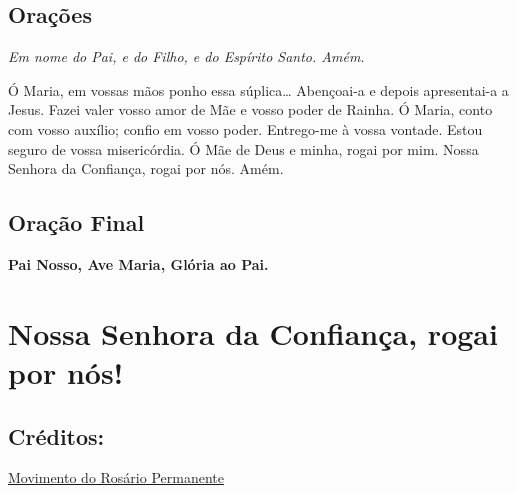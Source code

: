 \documentclass[18pt]{article}
\begin{document}
\begin{justify}

\newpage
\begin{center}
 \section{Orações}\label{sec:Orações} %
\textit{Em nome do Pai, e do Filho, e do Espírito Santo. Amém.}
\end{center}


Ó Maria, em vossas mãos ponho essa súplica…
Abençoai-a e depois apresentai-a a Jesus. Fazei valer vosso amor de Mãe e vosso poder de Rainha.
Ó Maria, conto com vosso auxílio; confio em vosso poder.
Entrego-me à vossa vontade. Estou seguro de vossa misericórdia.
Ó Mãe de Deus e minha, rogai por mim. Nossa Senhora da Confiança, rogai por nós. Amém.

\subsection{Oração Final}\label{sec:Oração_Final} %
\begin{center}
\textbf{Pai Nosso, Ave Maria, Glória ao Pai.}

\vfill
\section*{Nossa Senhora da Confiança, rogai por nós!}

\vfill
\subsection*{Créditos:}
\href{https://rosariopermanente.leiame.net/novena-a-nossa-senhora-da-confianca/}{Movimento do Rosário Permanente}

\end{center}


\end{justify}
\end{document}
